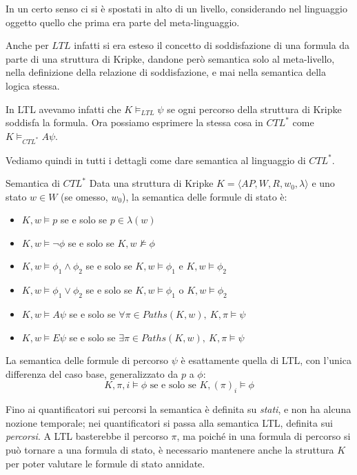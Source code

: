In un certo senso ci si è spostati in alto di un livello, considerando nel linguaggio oggetto quello che prima era parte del meta-linguaggio.

Anche per \(LTL\) infatti si era esteso il concetto di soddisfazione di una formula da parte di una struttura di Kripke, dandone però semantica solo al meta-livello, nella definizione della relazione di soddisfazione, e mai nella semantica della logica stessa.

In LTL avevamo infatti che \(K \models_{LTL} \psi\) se ogni percorso della struttura di Kripke soddisfa la formula. Ora possiamo esprimere la stessa cosa in \(CTL^*\) come \(K \models_{CTL^*} A\psi\).

Vediamo quindi in tutti i dettagli come dare semantica al linguaggio di \(CTL^*\).

\begin{definition}{Semantica di \(CTL^*\)}
  Data una struttura di Kripke \(K = \langle AP, W, R, w_0, \lambda \rangle\) e uno stato \(w \in W\) (se omesso, \(w_0\)), la semantica delle formule di stato è:
  \begin{itemize}
    \item \(K,w \models p\) se e solo se \(p \in \lambda(w)\)
    \item \(K,w \models \neg \phi\) se e solo se \(K,w \not\models \phi\)
    \item \(K,w \models \phi_1 \land \phi_2\) se e solo se \(K,w \models \phi_1\) e \(K,w \models \phi_2\)
    \item \(K,w \models \phi_1 \lor \phi_2\) se e solo se \(K,w \models \phi_1\) o \(K,w \models \phi_2\)
    \item \(K,w \models A\psi\) se e solo se \(\forall \pi \in Paths(K,w),\ K,\pi \models \psi\)
    \item \(K,w \models E\psi\) se e solo se \(\exists \pi \in Paths(K,w),\ K,\pi \models \psi\)
  \end{itemize}
  La semantica delle formule di percorso \(\psi\) è esattamente quella di LTL, con l'unica differenza del caso base, generalizzato da \(p\) a \(\phi\):
  \[K, \pi, i\models \phi \text{ se e solo se } K,{(\pi)}_i\models \phi\]
\end{definition}

\begin{note}{}
  Fino ai quantificatori sui percorsi la semantica è definita su \emph{stati}, e non ha alcuna nozione temporale; nei quantificatori si passa alla semantica LTL, definita sui \emph{percorsi}. A LTL basterebbe il percorso \(\pi\), ma poiché in una formula di percorso si può tornare a una formula di stato, è necessario mantenere anche la struttura \(K\) per poter valutare le formule di stato annidate.
\end{note}

